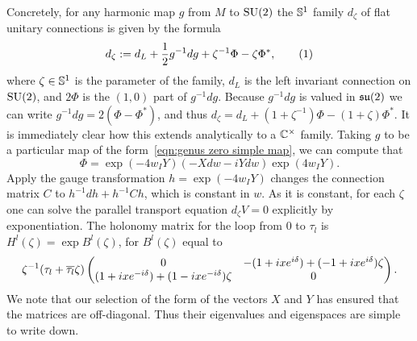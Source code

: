 \documentclass{article}
\begin{document}
Concretely, for any harmonic map $g$ from $M$ to $\SU(2)$ the $\S^1$ family $d_\zeta$ of flat unitary connections is given by the formula
\[
d_\zeta := d_L + \frac{1}{2}g^{-1}dg + \zeta^{-1}\Phi - \zeta\Phi^*,
\labelthis{eqn:flat connection translation}
\]
where $\zeta\in\S^1$ is the parameter of the family, $d_L$ is the left invariant connection on $\SU(2)$, and $2\Phi$ is the $(1,0)$ part of $g^{-1}dg$. Because $g^{-1}dg$ is valued in $\su(2)$ we can write $g^{-1}dg = 2(\Phi - \Phi^*)$, and thus $d_\zeta = d_L + (1+\zeta^{-1})\Phi - (1+\zeta)\Phi^*$.
It is immediately clear how this extends analytically to a $\C^\times$ family. Taking $g$ to be a particular map of the form~\eqref{eqn:genus zero simple map}, we can compute that
\[
\Phi = \exp(-4w_I Y)(-Xdw -iYdw)\exp(4w_I Y).
\]
Apply the gauge transformation $h = \exp(-4 w_I Y)$ changes the connection matrix $C$ to $h^{-1}dh + h^{-1}Ch$, which is constant in $w$.
As it is constant, for each $\zeta$ one can solve the parallel transport equation $d_\zeta V = 0$ explicitly by exponentiation.
The holonomy matrix for the loop from $0$ to $\tau_l$ is $H^l(\zeta) = \exp B^l(\zeta)$, for $B^l(\zeta)$ equal to 
\[
\zeta^{-1}(\tau_l + \bar{\tau_l}\zeta) 
\begin{pmatrix}
0 & - (1 + \iu xe^{\iu \delta}) + (-1 + \iu x e^{\iu \delta})\zeta \\
(1+\iu xe^{-\iu \delta}) + (1-\iu xe^{-\iu \delta})\zeta & 0
\end{pmatrix}.
\]
We note that our selection of the form of the vectors $X$ and $Y$ has ensured that the matrices are off-diagonal. Thus their eigenvalues and eigenspaces are simple to write down.
\end{document}
